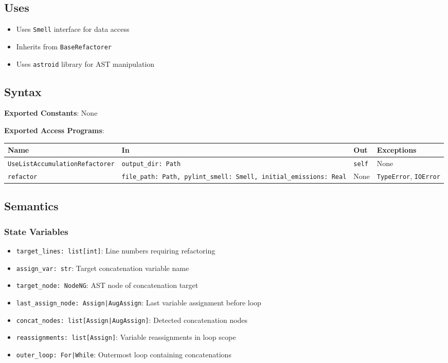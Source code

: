 \documentclass[12pt, titlepage]{article}
\begin{document}
  \subsection{Uses}
  \begin{itemize}
  \item Uses \texttt{Smell} interface for data access
  \item Inherits from \texttt{BaseRefactorer}
  \item Uses \texttt{astroid} library for AST manipulation
  \end{itemize}
  
  \subsection{Syntax}
  \noindent
  \textbf{Exported Constants}: None
  
  \noindent
  \textbf{Exported Access Programs}:
  
  \begin{tabularx}{\linewidth}{|
      l|
      >{\raggedright\arraybackslash}X|
      l|
      l|}
    \hline
    \textbf{Name} & \textbf{In} & \textbf{Out} & \textbf{Exceptions} \\
    \hline
    \texttt{UseListAccumulationRefactorer} & \texttt{output\_dir: Path} & \texttt{self} & None \\
    \hline
    \texttt{refactor} & \texttt{file\_path: Path, pylint\_smell: Smell, initial\_emissions: Real} & None & \texttt{TypeError}, \texttt{IOError} \\
    \hline
  \end{tabularx}
  
  \subsection{Semantics}
  
  \subsubsection{State Variables}
  \begin{itemize}
  \item \texttt{target\_lines: list[int]}: Line numbers requiring refactoring
  \item \texttt{assign\_var: str}: Target concatenation variable name
  \item \texttt{target\_node: NodeNG}: AST node of concatenation target
  \item \texttt{last\_assign\_node: Assign|AugAssign}: Last variable assignment before loop
  \item \texttt{concat\_nodes: list[Assign|AugAssign]}: Detected concatenation nodes
  \item \texttt{reassignments: list[Assign]}: Variable reassignments in loop scope
  \item \texttt{outer\_loop: For|While}: Outermost loop containing concatenations
  \end{itemize}
  
\end{document}
